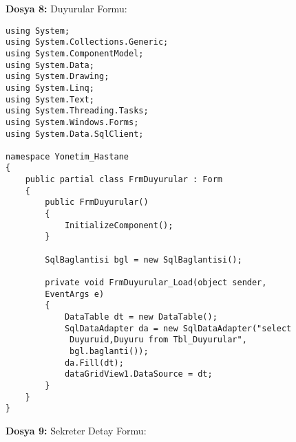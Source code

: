 \textbf{Dosya 8:} Duyurular Formu:

\begin{lstlisting}
using System;
using System.Collections.Generic;
using System.ComponentModel;
using System.Data;
using System.Drawing;
using System.Linq;
using System.Text;
using System.Threading.Tasks;
using System.Windows.Forms;
using System.Data.SqlClient;

namespace Yonetim_Hastane
{
    public partial class FrmDuyurular : Form
    {
        public FrmDuyurular()
        {
            InitializeComponent();
        }

        SqlBaglantisi bgl = new SqlBaglantisi();

        private void FrmDuyurular_Load(object sender, 
        EventArgs e)
        {
            DataTable dt = new DataTable();
            SqlDataAdapter da = new SqlDataAdapter("select
             Duyuruid,Duyuru from Tbl_Duyurular",
             bgl.baglanti());
            da.Fill(dt);
            dataGridView1.DataSource = dt;
        }
    }
}
\end{lstlisting}

\textbf{Dosya 9:} Sekreter Detay Formu:


